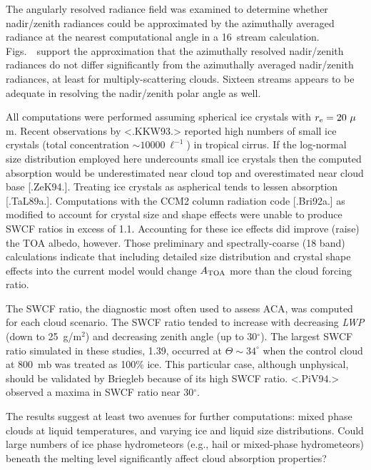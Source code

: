 
%
The angularly resolved radiance field was examined to determine
whether nadir/zenith radiances could be approximated by the
azimuthally averaged radiance at the nearest computational angle
in a 16~stream calculation.
Figs.~\ 
support the approximation that the
azimuthally resolved nadir/zenith radiances do not differ
significantly from the azimuthally averaged nadir/zenith radiances, at
least for multiply-scattering clouds.
Sixteen streams appears to be adequate in resolving the nadir/zenith
polar angle as well.

All computations were performed assuming spherical ice crystals with
$r_{\rm e} = 20\ \mu$m. 
Recent observations by <.KKW93.> reported high numbers of small ice
crystals (total concentration $\sim 10000\ \ell^{-1}$) in tropical
cirrus.  
If the log-normal size distribution employed here undercounts small
ice crystals then the computed absorption would be underestimated near
cloud top and overestimated near cloud base [.ZeK94.].
Treating ice crystals as aspherical tends to lessen absorption
[.TaL89a.].
Computations with the CCM2 column radiation code [.Bri92a.] 
as modified to account for crystal size and shape effects were unable
to produce SWCF ratios in excess of 1.1. 
Accounting for these ice effects did improve (raise) the TOA albedo,
however. 
Those preliminary and spectrally-coarse (18 band) calculations indicate
that including detailed size 
distribution and crystal shape effects into the current model would
change $A_{\rm TOA}$ more than the cloud forcing ratio.

The SWCF ratio, the diagnostic most often used to assess ACA, was
computed for each cloud scenario.
The SWCF ratio tended to increase with decreasing {\it LWP\/} (down to
25~g/m$^2$) and decreasing zenith angle (up to 30$^\circ$).
The largest SWCF ratio simulated in these studies, 1.39, occurred 
at $\Theta \sim 34^\circ$ when the control cloud at 800~mb was
treated as 100\% ice. 
This particular case, although unphysical, should be validated by
Briegleb because of its high SWCF ratio.
<.PiV94.> observed a maxima in SWCF ratio near 30$^\circ$.

The results suggest at least two avenues for further computations:
mixed phase clouds at liquid temperatures, and varying ice and liquid
size distributions.
Could large numbers of ice phase hydrometeors
(e.g., hail or mixed-phase hydrometeors) beneath the melting level
significantly affect cloud absorption properties? 

